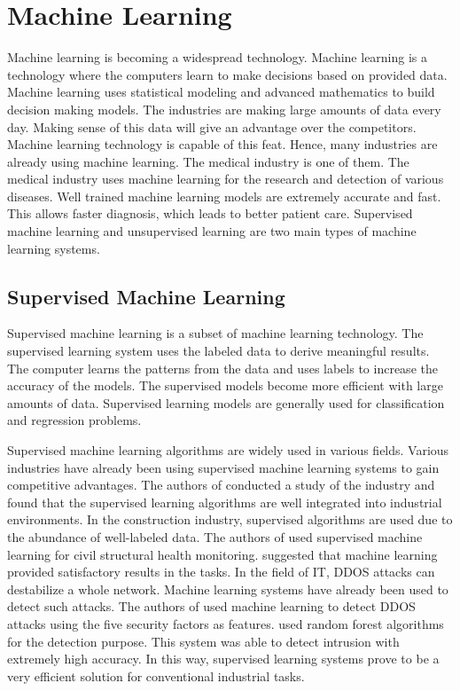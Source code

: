 \section{Machine Learning}\label{sec:machine_learning}

Machine learning is becoming a widespread technology. Machine learning is a technology where the computers learn to make decisions based on provided data. Machine learning uses statistical modeling and advanced mathematics to build decision making models. The industries are making large amounts of data every day. Making sense of this data will give an advantage over the competitors. Machine learning technology is capable of this feat. Hence, many industries are already using machine learning. The medical industry is one of them. The medical industry uses machine learning for the research and detection of various diseases. Well trained machine learning models are extremely accurate and fast. This allows faster diagnosis, which leads to better patient care. Supervised machine learning and unsupervised learning are two main types of machine learning systems.

\subsection{Supervised Machine Learning}\label{subsec:supervised_machine_learning}

Supervised machine learning is a subset of machine learning technology. The supervised learning system uses the labeled data to derive meaningful results. The computer learns the patterns from the data and uses labels to increase the accuracy of the models. The supervised models become more efficient with large amounts of data. Supervised learning models are generally used for classification and regression problems.

Supervised machine learning algorithms are widely used in various fields. Various industries have already been using supervised machine learning systems to gain competitive advantages. The authors of \cite{ref_paper_14} conducted a study of the industry and found that the supervised learning algorithms are well integrated into industrial environments. In the construction industry, supervised algorithms are used due to the abundance of well-labeled data. The authors of \cite{ref_paper_6} used supervised machine learning for civil structural health monitoring. \citeauthor{ref_paper_6} suggested that machine learning provided satisfactory results in the tasks. In the field of IT, DDOS attacks can destabilize a whole network. Machine learning systems have already been used to detect such attacks. The authors of \cite{ref_paper_9} used machine learning to detect DDOS attacks using the five security factors as features. \citeauthor{ref_paper_9} used random forest algorithms for the detection purpose. This system was able to detect intrusion with extremely high accuracy. In this way, supervised learning systems prove to be a very efficient solution for conventional industrial tasks.

